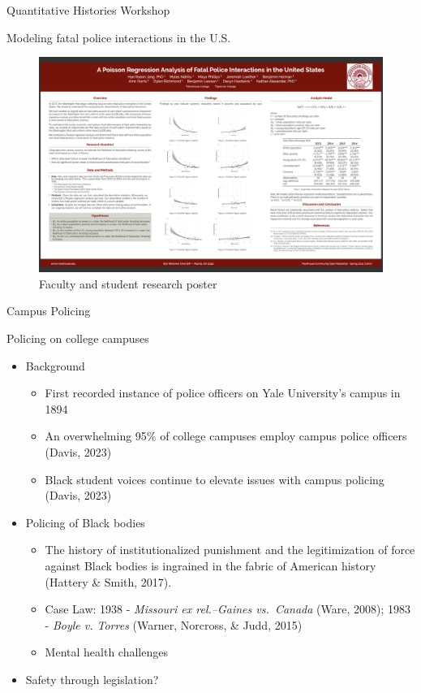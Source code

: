 \documentclass[
  ignorenonframetext,
]{beamer}
\begin{document}
\begin{frame}[fragile]{Quantitative Histories Workshop}
\begin{block}{Modeling fatal police interactions in the U.S.}
\protect\hypertarget{modeling-fatal-police-interactions-in-the-u.s.}{}
\begin{figure}
\centering
\includegraphics{poster3.png}
\caption{Faculty and student research poster}
\end{figure}
\end{block}

\begin{block}{Campus Policing}
\protect\hypertarget{campus-policing}{}
\end{block}

\begin{block}{Policing on college campuses}
\protect\hypertarget{policing-on-college-campuses}{}
\begin{itemize}[<+->]
\item
  Background

  \begin{itemize}[<+->]
  \item
    First recorded instance of police officers on Yale University's
    campus in 1894
  \item
    An overwhelming 95\% of college campuses employ campus police
    officers (Davis, 2023)
  \item
    Black student voices continue to elevate issues with campus policing
    (Davis, 2023)
  \end{itemize}
\item
  Policing of Black bodies

  \begin{itemize}[<+->]
  \item
    The history of institutionalized punishment and the legitimization
    of force against Black bodies is ingrained in the fabric of American
    history (Hattery \& Smith, 2017).
  \item
    Case Law: 1938 - \emph{Missouri ex rel.--Gaines vs.~Canada} (Ware,
    2008); 1983 - \emph{Boyle v. Torres} (Warner, Norcross, \& Judd,
    2015)
  \item
    Mental health challenges
  \end{itemize}
\item
  Safety through legislation?


\end{itemize}
\end{block}
\end{frame}
\end{document}
